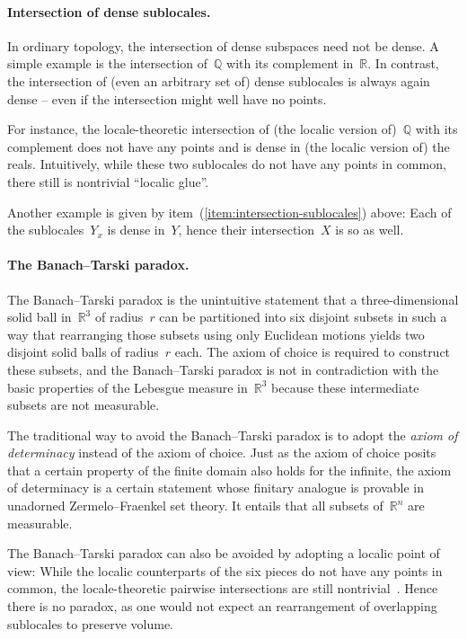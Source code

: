 \documentclass{ws-rv9x6}
\newcommand{\QQ}{\mathbb{Q}}
\newcommand{\RR}{\mathbb{R}}
\renewcommand{\_}{\mathpunct{.}}
\newcommand{\?}{\,{:}\,}
\begin{document}
\paragraph{Intersection of dense sublocales.} In ordinary topology, the
intersection of dense subspaces need not be dense. A simple example is the
intersection of~$\QQ$ with its complement in~$\RR$. In contrast, the
intersection of (even an arbitrary set of) dense sublocales is always again
dense -- even if the intersection might well have no points.

For instance, the locale-theoretic intersection of (the localic version
of)~$\QQ$ with its complement does not have any points and is dense in (the
localic version of) the reals. Intuitively, while these two sublocales do not
have any points in common, there still is nontrivial ``localic glue''.


Another example is given by item~(\ref{item:intersection-sublocales}) above:
Each of the sublocales~$Y_x$ is dense in~$Y$, hence their intersection~$X$ is
so as well.


\paragraph{The Banach--Tarski paradox.} The Banach--Tarski paradox is the
unintuitive statement that a three-dimensional solid ball in~$\RR^3$ of
radius~$r$ can be partitioned into six disjoint subsets in such a way that
rearranging those subsets using only Euclidean motions yields two disjoint
solid balls of radius~$r$ each. The axiom of choice is required to construct
these subsets, and the Banach--Tarski paradox is not in
contradiction with the basic properties of the Lebesgue measure in~$\RR^3$
because these intermediate subsets are not measurable.

The traditional way to avoid the Banach--Tarski paradox is to adopt the
\emph{axiom of determinacy} instead of the axiom of choice. Just as the axiom
of choice posits that a certain property of the finite domain also holds for the
infinite, the axiom of determinacy is a certain statement whose finitary
analogue is provable in unadorned Zermelo--Fraenkel set theory. It entails that
all subsets of~$\RR^n$ are measurable.

The Banach--Tarski paradox can also be avoided by adopting a localic point of
view: While the localic counterparts of the six pieces do not have any points
in common, the locale-theoretic pairwise intersections are still nontrivial~\cite{simpson:measure}.
Hence there is no paradox, as one would not expect an rearrangement of
overlapping sublocales to preserve volume.
\end{document}
